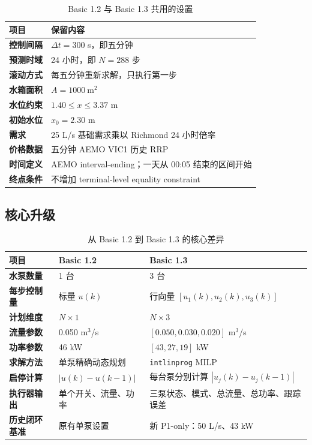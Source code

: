 \documentclass[UTF8,a4paper,11pt]{ctexart}
\newcommand{\code}[1]{\texttt{#1}}
\begin{document}
\begin{table}[htbp]
\centering
\caption{Basic 1.2 与 Basic 1.3 共用的设置}
\begin{tabularx}{\linewidth}{>{\bfseries}l X}
\toprule
项目 & 保留内容 \\
\midrule
控制间隔 & $\Delta t=300$ s，即五分钟 \\
预测时域 & 24 小时，即 $N=288$ 步 \\
滚动方式 & 每五分钟重新求解，只执行第一步 \\
水箱面积 & $A=1000\ \mathrm{m^2}$ \\
水位约束 & $1.40\le x\le3.37$ m \\
初始水位 & $x_0=2.30$ m \\
需求 & 25 L/s 基础需求乘以 Richmond 24 小时倍率 \\
价格数据 & 五分钟 AEMO VIC1 历史 RRP \\
时间定义 & AEMO interval-ending；一天从 00:05 结束的区间开始 \\
终点条件 & 不增加 terminal-level equality constraint \\
\bottomrule
\end{tabularx}
\end{table}

\subsection{核心升级}

\begin{table}[htbp]
\centering
\caption{从 Basic 1.2 到 Basic 1.3 的核心差异}
\begin{tabularx}{\linewidth}{>{\bfseries}p{3.2cm} X X}
\toprule
项目 & Basic 1.2 & Basic 1.3 \\
\midrule
水泵数量 & 1 台 & 3 台 \\
每步控制量 & 标量 $u(k)$ & 行向量 $[u_1(k),u_2(k),u_3(k)]$ \\
计划维度 & $N\times1$ & $N\times3$ \\
流量参数 & 0.050 m$^3$/s & $[0.050,0.030,0.020]$ m$^3$/s \\
功率参数 & 46 kW & $[43,27,19]$ kW \\
求解方法 & 单泵精确动态规划 & \code{intlinprog} MILP \\
启停计算 & $|u(k)-u(k-1)|$ & 每台泵分别计算 $|u_j(k)-u_j(k-1)|$ \\
执行器输出 & 单个开关、流量、功率 & 三泵状态、模式、总流量、总功率、跟踪误差 \\
历史闭环基准 & 原有单泵设置 & 新 P1-only：50 L/s、43 kW \\
\bottomrule
\end{tabularx}
\end{table}
\end{document}
